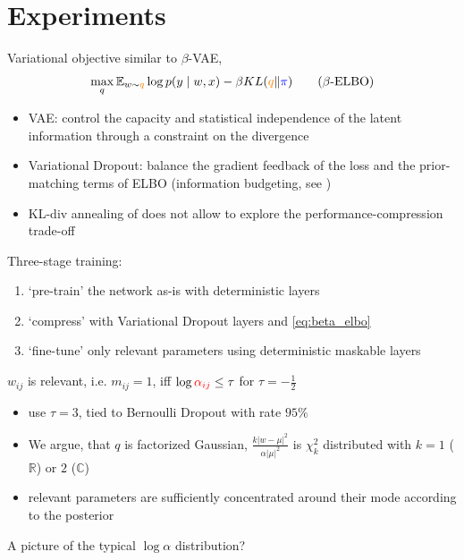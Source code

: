\documentclass{beamer}
\newcommand{\real}{\mathbb{R}}
\newcommand{\cplx}{\mathbb{C}}
\begin{document}

\section{Experiments} %
\label{sec:experiments}

\begin{frame}[c]{\insertsection}
  Variational objective similar to $\beta$-VAE, \citep{higgins_beta-vae_2017}
  \begin{equation}
  \label{eq:beta_elbo}
    \max_q
    \mathbb{E}_{w \sim {\color{orange} q}}
      \log p(y\mid w, x)  %
    - \beta KL({\color{orange} q}\|{\color{blue} \pi})
    \tag{$\beta$-ELBO}
  \end{equation}
  \begin{itemize}
    \item VAE: control the capacity and statistical independence of the latent
    information through a constraint on the divergence
    \item Variational Dropout: balance the gradient feedback of the loss and the
    prior-matching terms of ELBO (information budgeting, see \citep{BitsBack})
    \item KL-div annealing of \citet{molchanov_variational_2017} does not allow
    to explore the performance-compression trade-off
  \end{itemize}
\end{frame}

\begin{frame}[c]{\insertsection}
  Three-stage training:
  \begin{enumerate}
    \item `pre-train' the network as-is with deterministic layers
    \item `compress' with Variational Dropout layers and \eqref{eq:beta_elbo}
    \item `fine-tune' only relevant parameters using deterministic maskable layers
  \end{enumerate}

  \medskip
  $w_{ij}$ is relevant, i.e. $m_{ij} = 1$, iff $
    \log{{\color{red} \alpha_{ij}}} \leq \tau
  $ for $\tau = -\tfrac12$
  \begin{itemize}
    \item \citet{molchanov_variational_2017,kingma_variational_2015} use $\tau=3$,
      tied to Bernoulli Dropout with rate $95\%$
    \item We argue, that $q$ is factorized Gaussian, $
        \tfrac{k \lvert w - \mu \rvert^2}
              {\alpha \lvert \mu \rvert^2}
      $ is $\chi^2_k$ distributed with $k=1$ ($\real$) or $2$ ($\cplx$)
    \item relevant parameters are sufficiently concentrated around their mode according
    to the posterior
  \end{itemize}

  A picture of the typical $\log \alpha$ distribution?
\end{frame}
\end{document}
